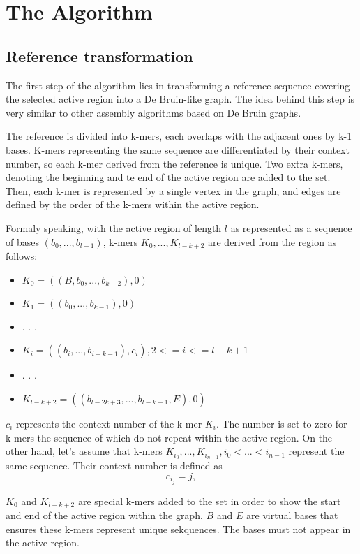 \chapter{The Algorithm}

\section{Reference transformation}

The first step of the algorithm lies in transforming a reference sequence covering the selected active region into a De Bruin-like graph. The idea behind this step is very similar to other assembly algorithms based on De Bruin graphs. 

The reference is divided into k-mers, each overlaps with the adjacent ones by k-1 bases. K-mers representing the same sequence are differentiated by their context number, so each k-mer derived from the reference is unique. Two extra k-mers, denoting the beginning and te end of the active region are added to the set. Then, each k-mer is represented by a single vertex in the graph, and edges are defined by the order of the k-mers within the active region.

Formaly speaking, with the active region of length $l$ as represented as a sequence of bases $(b_0, ..., b_{l-1})$, k-mers $K_0, ..., K_{l-k+2}$ are derived from the region as follows:
\begin{itemize}
\item $K_0 = ((B, b_0, ..., b_{k-2}), 0)$
\item $K_1 = ((b_0, ..., b_{k-1}), 0)$
\item . . .
\item $K_i = ((b_i, ..., b_{i+k-1}), c_i), 2 <= i <=  l-k+1$
\item . . .
\item $K_{l-k+2} = ((b_{l-2k+3}, ..., b_{l-k+1}, E), 0)$
\end{itemize}
$c_i$ represents the context number of the k-mer $K_i$. The number is set to zero for k-mers the sequence of which do not repeat within the active region. On the other hand, let's assume that k-mers $K_{i_0}, ..., K_{i_{n-1}}, i_0 < ... < i_{n-1}$ represent the same sequence. Their context number is defined as
$$
c_{i_j} = j, 
$$

$K_0$ and $K_{l-k+2}$ are special k-mers added to the set in order to show the start and end of the active region within the graph. $B$ and $E$ are virtual bases that ensures these k-mers represent unique sekquences. The bases must not appear in the active region.

